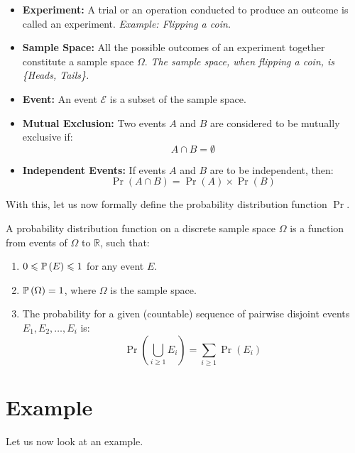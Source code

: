     \begin{itemize}
        \item \textbf{Experiment: }A trial or an operation conducted to produce an outcome is called an experiment.
        \textit{Example: Flipping a coin.}

        \item \textbf{Sample Space: }All the possible outcomes of an experiment together constitute a sample space \(\Omega\).
        \textit{The sample space, when flipping a coin, is \{Heads, Tails\}.}

        \item \textbf{Event: }An event \(\mathcal{E}\) is a subset of the sample space.

        \item \textbf{Mutual Exclusion: }Two events \(A\) and \(B\) are considered to be mutually exclusive if:
            \[
                A \cap B = \emptyset
            \]

        \item \textbf{Independent Events: }If events \(A\) and \(B\) are to be independent, then:
            \[
                \Pr(A \cap B) = \Pr(A) \times \Pr(B)
            \]
    \end{itemize}

    With this, let us now formally define the probability distribution function $\Pr$.
        
    \begin{theorem}
        A probability distribution function on a discrete sample space \(\Omega\) is a function from events of $\Omega$ to $\mathbb{R}$, such that:

        \begin{enumerate}
            \item $0 \leqslant \operatorname{\mathbb{P}}\left(E\right) \leqslant 1$ for any event $E$.
            \item $\operatorname{\mathbb{P}}\left(\Omega\right) = 1$, where $\Omega$ is the sample space.
            \item The probability for a given (countable) sequence of pairwise disjoint events $E_1, E_2, \dots, E_i$ is:
                \[
                    \Pr\left(\bigcup_{i \geq 1} E_i\right) = \sum_{i \geq 1} \Pr(E_i)
                \]
        \end{enumerate}
    \end{theorem}

\section*{Example}
    Let us now look at an example.

